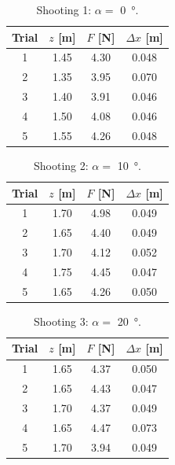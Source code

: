 			\begin{table}\centering
			\begin{tabular}{@{}cccc@{}}\toprule
			Trial & $z$ [m] & $F$ [N] & $\Delta x$ [m] \\ \midrule

			1 & 1.45 & 4.30 & 0.048 \\
			2 & 1.35 & 3.95 & 0.070 \\
			3 & 1.40 & 3.91 & 0.046 \\
			4 & 1.50 & 4.08 & 0.046 \\
			5 & 1.55 & 4.26 & 0.048 \\
		
			\bottomrule
			\end{tabular}
			\caption{Shooting 1: $\alpha = $ \SI{0}{\degree}.}
			\label{table: exp alpha 0}
			\end{table}

			\begin{table}\centering
			\begin{tabular}{@{}cccc@{}}\toprule
			Trial & $z$ [m] & $F$ [N] & $\Delta x$ [m] \\ \midrule

			1 & 1.70 & 4.98 & 0.049 \\
			2 & 1.65 & 4.40 & 0.049 \\
			3 & 1.70 & 4.12 & 0.052 \\
			4 & 1.75 & 4.45 & 0.047 \\
			5 & 1.65 & 4.26 & 0.050 \\
		
			\bottomrule
			\end{tabular}
			\caption{Shooting 2: $\alpha = $ \SI{10}{\degree}.}
			\label{table: exp alpha 10}
			\end{table}

			\begin{table}\centering
			\begin{tabular}{@{}cccc@{}}\toprule
			Trial & $z$ [m] & $F$ [N] & $\Delta x$ [m] \\ \midrule

			1 & 1.65 & 4.37 & 0.050 \\
			2 & 1.65 & 4.43 & 0.047 \\
			3 & 1.70 & 4.37 & 0.049 \\
			4 & 1.65 & 4.47 & 0.073 \\
			5 & 1.70 & 3.94 & 0.049 \\
		
			\bottomrule
			\end{tabular}
			\caption{Shooting 3: $\alpha = $ \SI{20}{\degree}.}
			\label{table: exp alpha 20}
			\end{table}

